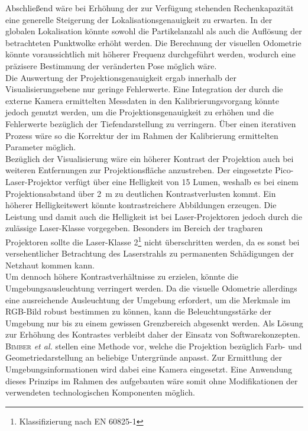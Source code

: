Abschließend wäre bei Erhöhung der zur Verfügung stehenden Rechenkapazität eine generelle Steigerung der Lokalisationsgenauigkeit zu erwarten. In der globalen Lokalisation könnte sowohl die Partikelanzahl als auch die Auflösung der betrachteten Punktwolke erhöht werden. Die Berechnung der visuellen Odometrie könnte voraussichtlich mit höherer Frequenz durchgeführt werden, wodurch eine präzisere Bestimmung der veränderten Pose möglich wäre.\\

Die Auswertung der Projektionsgenauigkeit ergab innerhalb der Visualisierungsebene nur geringe Fehlerwerte. Eine Integration der durch die externe Kamera ermittelten Messdaten in den Kalibrierungsvorgang könnte jedoch genutzt werden, um die Projektionsgenauigkeit zu erhöhen und die Fehlerwerte bezüglich der Tiefendarstellung zu verringern. Über einen iterativen Prozess wäre so die Korrektur der im Rahmen der Kalibrierung ermittelten Parameter möglich.\\

Bezüglich der Visualisierung wäre ein höherer Kontrast der Projektion auch bei weiteren Entfernungen zur Projektionsfläche anzustreben. Der eingesetzte Pico-Laser-Projektor verfügt über eine Helligkeit von 15 Lumen, weshalb es bei einem Projektionsabstand über \SI{2}{\meter} zu deutlichen Kontrastverlusten kommt. Ein höherer Helligkeitswert könnte kontrastreichere Abbildungen erzeugen. Die Leistung und damit auch die Helligkeit ist bei Laser-Projektoren jedoch durch die zulässige Laser-Klasse vorgegeben. Besonders im Bereich der tragbaren Projektoren sollte die Laser-Klasse 2\footnote{Klassifizierung nach EN 60825-1} nicht überschritten werden, da es sonst bei versehentlicher Betrachtung des Laserstrahls zu permanenten Schädigungen der Netzhaut kommen kann.\\

Um dennoch höhere Kontrastverhältnisse zu erzielen, könnte die Umgebungsausleuchtung verringert werden. Da die visuelle Odometrie allerdings eine ausreichende Ausleuchtung der Umgebung erfordert, um die Merkmale im RGB-Bild robust bestimmen zu können, kann die Beleuchtungsstärke der Umgebung nur bis zu einem gewissen Grenzbereich abgesenkt werden. Als Lösung zur Erhöhung des Kontrastes verbleibt daher der Einsatz von Softwarekonzepten. \textsc{Bimber} \textit{et al.} \cite{Bimber2005} stellen eine Methode vor, welche die Projektion bezüglich Farb- und Geometriedarstellung an beliebige Untergründe anpasst. Zur Ermittlung der Umgebungsinformationen wird dabei eine Kamera eingesetzt. Eine Anwendung dieses Prinzips im Rahmen des aufgebauten  wäre somit ohne Modifikationen der verwendeten technologischen Komponenten möglich.\\ 

